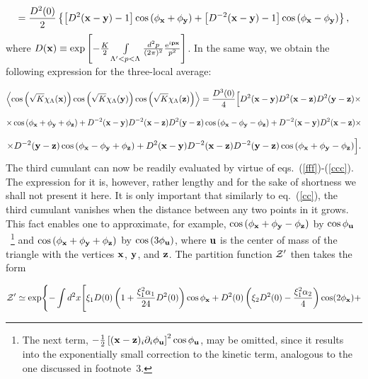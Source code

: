 \documentclass[a4paper,12pt]{article}
\begin{document}
\begin{equation}
\label{cc}
=\frac{D^2(0)}{2}\left\{\left[D^2({\bf x}-{\bf y})-1\right]\cos\left(\phi_{\bf x}+\phi_{\bf y}\right)+
\left[D^{-2}({\bf x}-{\bf y})-1\right]\cos\left(\phi_{\bf x}-\phi_{\bf y}\right)\right\},
\end{equation}
where $D({\bf x})\equiv\exp\left[-\frac{K}{2}\int\limits_{\Lambda'<p<\Lambda}^{}\frac{d^2p}{(2\pi)^2}
\frac{{\rm e}^{i{\bf p}{\bf x}}}{p^2}\right]$. In the same way, we obtain the following expression for the
three-local average:


$$
\left<\cos\left(\sqrt{K}\chi_\Lambda({\bf x})\right)\cos\left(\sqrt{K}\chi_\Lambda({\bf y})\right)
\cos\left(\sqrt{K}\chi_\Lambda({\bf z})\right)\right>=\frac{D^3(0)}{4}\Bigl[D^2({\bf x}-{\bf y})
D^2({\bf x}-{\bf z})D^2({\bf y}-{\bf z})\times$$

$$\times\cos\left(\phi_{\bf x}+\phi_{\bf y}+\phi_{\bf z}\right)+D^{-2}({\bf x}-{\bf y})
D^{-2}({\bf x}-{\bf z})D^2({\bf y}-{\bf z})\cos\left(\phi_{\bf x}-\phi_{\bf y}-\phi_{\bf z}\right)+
D^{-2}({\bf x}-{\bf y})
D^2({\bf x}-{\bf z})\times$$


\begin{equation}
\label{ccc}
\times D^{-2}({\bf y}-{\bf z})\cos\left(\phi_{\bf x}-\phi_{\bf y}+\phi_{\bf z}\right)+D^2({\bf x}-{\bf y})
D^{-2}({\bf x}-{\bf z})D^{-2}({\bf y}-{\bf z})\cos\left(\phi_{\bf x}+\phi_{\bf y}-\phi_{\bf z}\right)\Bigr].
\end{equation}
The third cumulant can now be readily evaluated by virtue of eqs.~(\ref{fff})-(\ref{ccc}). The expression for it is, however,
rather lengthy and for the sake of shortness
we shall not present it here. It is only important that similarly to eq.~(\ref{cc}), the third cumulant
vanishes when the distance between any two points in it grows. This fact enables one to approximate, for example,
$\cos\left(\phi_{\bf x}+\phi_{\bf y}-\phi_{\bf z}\right)$ by $\cos\phi_{\bf u}$~\footnote{The next term, $-\frac12\left[
({\bf x}-{\bf z})_i\partial_i\phi_{\bf u}\right]^2\cos\phi_{\bf u}$, may be omitted, since it results into the exponentially small
correction to the kinetic term, analogous to the one discussed in footnote~3.} and
$\cos\left(\phi_{\bf x}+\phi_{\bf y}+\phi_{\bf z}\right)$ by $\cos\left(3\phi_{\bf u}\right)$, where
${\bf u}$ is the center of mass of the triangle with the vertices ${\bf x}$, ${\bf y}$, and ${\bf z}$.
The partition function ${\cal Z}'$ then takes the form

$$
{\cal Z}'\simeq\exp\Biggl\{-\int d^2x\Biggl[\xi_1D(0)\left(1+\frac{\xi_1^2\alpha_1}{24}D^2(0)\right)\cos\phi_{\bf x}+D^2(0)
\left(\xi_2D^2(0)-\frac{\xi_1^2\alpha_2}{4}\right)\cos(2\phi_{\bf x})+$$
\end{document}
